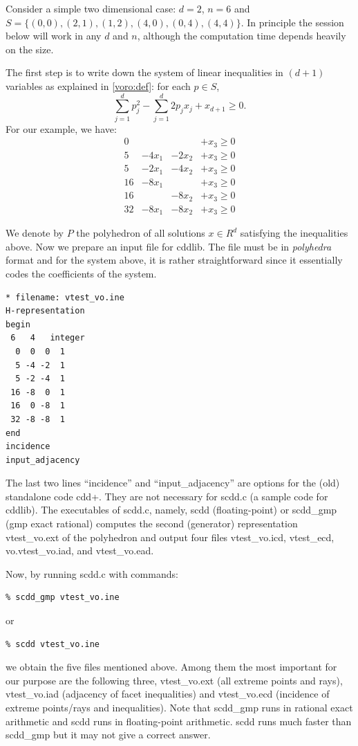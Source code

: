 \documentclass[[a4paper,12pt]{article}
\begin{document}
\begin{small}
Consider a simple two dimensional case: $d=2$, $n=6$ and
 $S = \{(0,0), (2,1), (1,2), (4,0), (0,4),(4,4) \}$.  In principle
the session below will work in any $d$ and $n$, although 
the computation time depends heavily on the size.

The first step is to write down the system of linear inequalities
in $(d+1)$ variables as explained in \ref{voro:def}:
for each $p\in S$,
\[
\sum_{j=1}^d p_j^2 - \sum_{j=1}^d 2 p_j x_j + x_{d+1} \ge 0.
\]
For our example, we have:
\[
\begin{array}{rrrr}
  0 &        &        & + x_3 \ge 0\\
  5 & -4 x_1 & -2 x_2 & + x_3 \ge 0\\
  5 & -2 x_1 & -4 x_2 & + x_3 \ge 0\\
 16 & -8 x_1 &        & + x_3 \ge 0\\
 16 &        & -8 x_2 & + x_3 \ge 0\\
 32 & -8 x_1 & -8 x_2 & + x_3 \ge 0
\end{array}
\]


We denote by $P$ the polyhedron of all solutions $x\in R^d$
satisfying the inequalities above.
Now we prepare an input file for cddlib.  The file must 
be in {\em polyhedra\/} format and for the system above,
it is rather straightforward since it essentially
codes the coefficients of the system.

\begin{verbatim}
* filename: vtest_vo.ine
H-representation
begin
 6   4   integer
  0  0  0  1
  5 -4 -2  1
  5 -2 -4  1
 16 -8  0  1
 16  0 -8  1
 32 -8 -8  1
end
incidence
input_adjacency
\end{verbatim}

\noindent
The last two lines ``incidence'' and ``input\_adjacency''
are options for the (old) standalone code cdd+.  They are not necessary
for scdd.c (a sample code for cddlib).   The executables of scdd.c, namely,
scdd (floating-point) or scdd\_gmp (gmp exact rational) computes
the second (generator) representation vtest\_vo.ext of the polyhedron and output
four files vtest\_vo.icd, vtest\_ecd, vo.vtest\_vo.iad, and vtest\_vo.ead.

Now, by running scdd.c with commands:

\begin{verbatim}
% scdd_gmp vtest_vo.ine
\end{verbatim}
or
\begin{verbatim}
% scdd vtest_vo.ine
\end{verbatim}
we obtain the five files mentioned above.  
Among them the most important for our purpose are
the following three, vtest\_vo.ext (all extreme points and rays), 
vtest\_vo.iad (adjacency of facet inequalities) and 
vtest\_vo.ecd (incidence of extreme points/rays and inequalities).  Note
that scdd\_gmp runs in rational exact arithmetic and scdd runs in
floating-point arithmetic.  scdd runs much faster than scdd\_gmp but
it may not give a correct answer.


\end{small}
\end{document}
